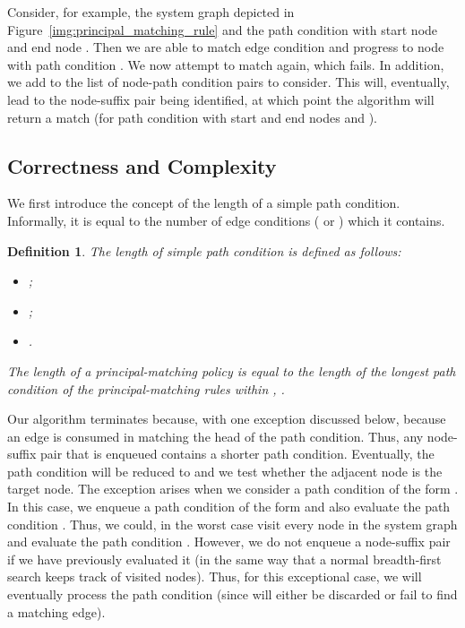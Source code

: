 \documentclass{article}
\newtheorem{definition}{Definition}
\begin{document}
Consider, for example, the system graph depicted in Figure~\ref{img:principal_matching_rule} and the path condition  with start node  and end node .
Then we are able to match edge condition  and progress to node  with path condition .
We now attempt to match  again, which fails.
In addition, we add  to the list of node-path condition pairs to consider.
This will, eventually, lead to the node-suffix pair  being identified, at which point the algorithm will return a match (for path condition  with start and end nodes  and ).

\subsection{Correctness and Complexity}\label{sec:Algorithm:Complexity}

We first introduce the concept of the length of a simple path condition.
Informally, it is equal to the number of edge conditions ( or ) which it contains.

\begin{definition}
    The \emph{length}  of simple path condition  is defined as follows:
    \begin{itemize}
        \item  ;
        \item  ;
        \item  .
    \end{itemize}
    The \emph{length}  of a principal-matching policy  is equal to the length of the longest path condition of the principal-matching rules within ,
    .
\end{definition}

Our algorithm terminates because, with one exception discussed below,  because an edge is consumed in matching the head of the path condition.
Thus, any node-suffix pair that is enqueued contains a shorter path condition.
Eventually, the path condition will be reduced to  and we test whether the adjacent node is the target node.
The exception arises when we consider a path condition of the form .
In this case, we enqueue a path condition of the form  and also evaluate the path condition .
Thus, we could, in the worst case visit every node in the system graph and evaluate the path condition .
However, we do not enqueue a node-suffix pair if we have previously evaluated it (in the same way that a normal breadth-first search keeps track of visited nodes).
Thus, for this exceptional case, we will eventually process the path condition  (since  will either be discarded or fail to find a matching edge).
\end{document}
